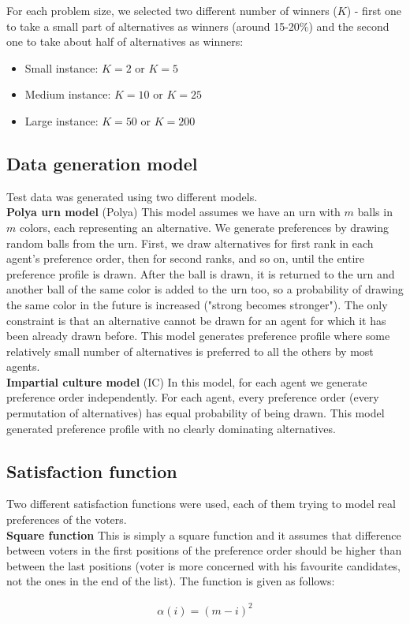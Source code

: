 For each problem size, we selected two different number of winners ($K$) - first one to take a small part of alternatives as winners (around 15-20\%) and the second one to take about half of alternatives as winners:
\begin{itemize}
	\item Small instance: $K = 2$ or $K = 5$
	\item Medium instance: $K = 10$ or $K = 25$
	\item Large instance: $K = 50$ or $K = 200$
\end{itemize}

\subsection{Data generation model}

Test data was generated using two different models.
\\

\noindent
\textbf{Polya urn model} (Polya) \hspace{.1in} This model assumes we have an urn with $m$ balls in $m$ colors, each representing an alternative. We generate preferences by drawing random balls from the urn. First, we draw alternatives for first rank in each agent's preference order, then for second ranks, and so on, until the entire preference profile is drawn. After the ball is drawn, it is returned to the urn and another ball of the same color is added to the urn too, so a probability of drawing the same color in the future is increased ("strong becomes stronger"). The only constraint is that an alternative cannot be drawn for an agent for which it has been already drawn before. This model generates preference profile where some relatively small number of alternatives is preferred to all the others by most agents.
\\

\noindent
\textbf{Impartial culture model} (IC) \hspace{.1in} In this model, for each agent we generate preference order independently. For each agent, every preference order (every permutation of alternatives) has equal probability of being drawn. This model generated preference profile with no clearly dominating alternatives.

\subsection{Satisfaction function}

Two different satisfaction functions were used, each of them trying to model real preferences of the voters.
\\

\noindent
\textbf{Square function} \hspace{.1in} This is simply a square function and it assumes that difference between voters in the first positions of the preference order should be higher than between the last positions (voter is more concerned with his favourite candidates, not the ones in the end of the list). The function is given as follows:

\begin{gather}
	\alpha(i) = (m - i)^{2}
\end{gather}

